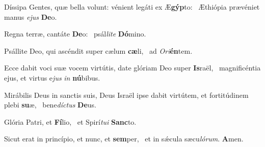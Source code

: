 \item Díssipa Gentes, quæ bella volunt: vénient legáti ex Æ\textbf{gýp}to:~\psstar{} Æthiópia prævéniet manus \textit{ejus} \textbf{De}o.
\item Regna terræ, cantáte \textbf{De}o:~\psstar{} psál\textit{lite} \textbf{Dó}mino.
\item Psállite Deo, qui ascéndit super cælum \textbf{cæ}li,~\psstar{} ad \textit{Ori}\textbf{én}tem.
\item Ecce dabit voci suæ vocem virtútis, date glóriam Deo super \textbf{Is}raël,~\psstar{} magnificéntia ejus, et virtus e\textit{jus} \textit{in} \textbf{nú}bibus.
\item Mirábilis Deus in sanctis suis, Deus Israël ipse dabit virtútem, et fortitúdinem plebi \textbf{su}æ,~\psstar{} bene\textit{díctus} \textbf{De}us.
\item Glória Patri, et \textbf{Fí}lio,~\psstar{} et Spirí\textit{tui} \textbf{Sanc}to.
\item Sicut erat in princípio, et nunc, et \textbf{sem}per,~\psstar{} et in sǽcula sæcu\textit{lórum}. \textbf{A}men.
